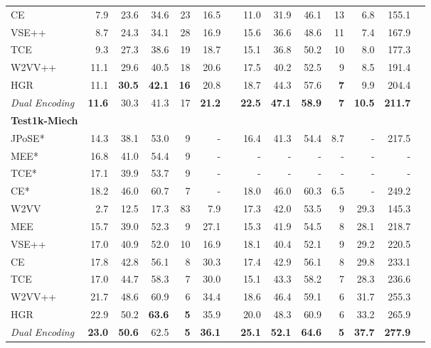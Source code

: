 \begin{table*} [tb!]
{\begin{tabular}{@{}l*{12}{r}c @{}}
CE \cite{liu2019use}              & 7.9 & 23.6 & 34.6 & 23 & 16.5 &&       11.0 & 31.9 & 46.1 & 13  & 6.8 & 155.1 \\
VSE++ \cite{faghri2017vse}        & 8.7  & 24.3 & 34.1 & 28 & 16.9 &&      15.6 & 36.6 & 48.6 & 11 & 7.4 & 167.9 \\
TCE \cite{sigir2020tree}          & 9.3 & 27.3 & 38.6 & 19 & 18.7 &&       15.1 & 36.8 & 50.2 & 10 & 8.0 & 177.3 \\
W2VV++ \cite{li2019w2vv++}        & 11.1 & 29.6 & 40.5 & 18 & 20.6 &&      17.5 & 40.2 & 52.5 & 9 & 8.5 & 191.4 \\
HGR \cite{chen2020fine}           & 11.1 &	\textbf{30.5} &	\textbf{42.1} & \textbf{16} & 20.8 &&    18.7 & 44.3 & 57.6 & \textbf{7} & 9.9 & 204.4 \\
\textit{Dual Encoding}         & \textbf{11.6} & 30.3 & 41.3 & 17 & \textbf{21.2} && \textbf{22.5} & \textbf{47.1} & \textbf{58.9} & \textbf{7} & \textbf{10.5} & \textbf{211.7} \\  [3pt]


\hline
\textbf{Test1k-Miech \cite{miech2018learning}}  \\
JPoSE*  \cite{wray2019fine}                & 14.3 & 38.1 & 53.0 & 9 & - && 16.4 & 41.3 & 54.4 & 8.7 & - & 217.5 \\
MEE* \cite{miech2018learning}               & 16.8 & 41.0 & 54.4 & 9 & - && - & - & - & - & - & -  \\
TCE* \cite{sigir2020tree}                  & 17.1 & 39.9 & 53.7 & 9 & - && - & - & - & - & - & -  \\
CE* \cite{liu2019use}                      & 18.2 & 46.0 & 60.7 & 7 & - && 18.0 & 46.0  & 60.3 & 6.5 & - & 249.2 \\
\cmidrule{2-13}
W2VV \cite{dong2018predicting}            & 2.7 & 12.5 & 17.3 & 83 & 7.9 &&      17.3 & 42.0 & 53.5 & 9 & 29.3 & 145.3 \\
MEE \cite{miech2018learning}             & 15.7 & 39.0 & 52.3 & 9 & 27.1  && 15.3 & 41.9 & 54.5& 8 & 28.1 & 218.7 \\
VSE++ \cite{faghri2017vse}               & 17.0 & 40.9 & 52.0 & 10 & 16.9 &&     18.1 & 40.4 & 52.1 & 9 & 29.2 & 220.5 \\
CE \cite{liu2019use}                     & 17.8 & 42.8 & 56.1 & 8 & 30.3  &&   17.4 & 42.9 & 56.1 & 8 & 29.8 & 233.1 \\
TCE \cite{sigir2020tree}                 & 17.0 & 44.7 & 58.3 & 7 & 30.0  &&   15.1 & 43.3 & 58.2 & 7 & 28.3 & 236.6 \\
W2VV++ \cite{li2019w2vv++}               & 21.7 & 48.6 & 60.9 & 6 & 34.4 &&    18.6 & 46.4 & 59.1 & 6 & 31.7 & 255.3 \\
HGR \cite{chen2020fine}                  & 22.9 & 50.2 & \textbf{63.6} & \textbf{5} & 35.9  &&   20.0 & 48.3 & 60.9 & 6 & 33.2 & 265.9 \\
\textit{Dual Encoding}         & \textbf{23.0} & \textbf{50.6} & 62.5 & \textbf{5} & \textbf{36.1} && \textbf{25.1} & \textbf{52.1} & \textbf{64.6} & \textbf{5} & \textbf{37.7} & \textbf{277.9} \\ [3pt]




\end{tabular}}
\end{table*}
